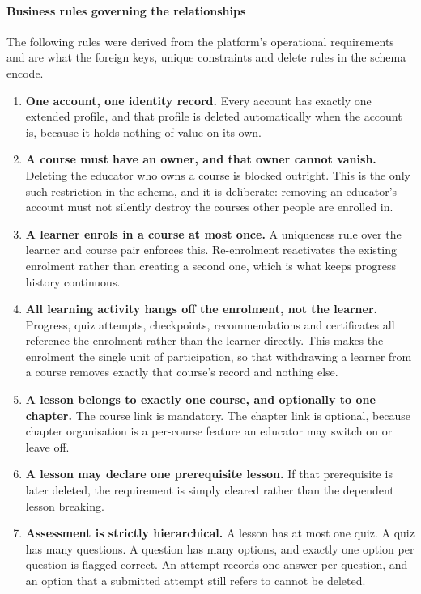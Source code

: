 \documentclass[12pt, oneside]{article} %
\begin{document}
\paragraph{Business rules governing the relationships}

The following rules were derived from the platform's operational requirements and are what the foreign keys, unique constraints and delete rules in the schema encode.

\begin{enumerate}
    \item \textbf{One account, one identity record.} Every account has exactly one extended profile, and that profile is deleted automatically when the account is, because it holds nothing of value on its own.
    \item \textbf{A course must have an owner, and that owner cannot vanish.} Deleting the educator who owns a course is blocked outright. This is the only such restriction in the schema, and it is deliberate: removing an educator's account must not silently destroy the courses other people are enrolled in.
    \item \textbf{A learner enrols in a course at most once.} A uniqueness rule over the learner and course pair enforces this. Re-enrolment reactivates the existing enrolment rather than creating a second one, which is what keeps progress history continuous.
    \item \textbf{All learning activity hangs off the enrolment, not the learner.} Progress, quiz attempts, checkpoints, recommendations and certificates all reference the enrolment rather than the learner directly. This makes the enrolment the single unit of participation, so that withdrawing a learner from a course removes exactly that course's record and nothing else.
    \item \textbf{A lesson belongs to exactly one course, and optionally to one chapter.} The course link is mandatory. The chapter link is optional, because chapter organisation is a per-course feature an educator may switch on or leave off.
    \item \textbf{A lesson may declare one prerequisite lesson.} If that prerequisite is later deleted, the requirement is simply cleared rather than the dependent lesson breaking.
    \item \textbf{Assessment is strictly hierarchical.} A lesson has at most one quiz. A quiz has many questions. A question has many options, and exactly one option per question is flagged correct. An attempt records one answer per question, and an option that a submitted attempt still refers to cannot be deleted.

\end{enumerate}
\end{document}
